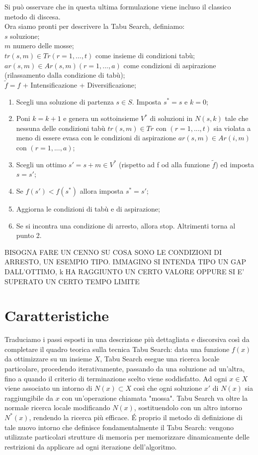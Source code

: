 Si può osservare che in questa ultima formulazione viene incluso il classico metodo di discesa.\\
Ora siamo pronti per descrivere la Tabu Search, definiamo:\\
$s$ soluzione;\\
$m$ numero delle mosse;\\
$tr(s,m) \in Tr (r=1,...,t)$ come insieme di condizioni tabù;\\
$ar(s,m) \in Ar(s,m) (r=1,...,a)$ come condizioni di aspirazione (rilassamento dalla condizione di tabù);\\
$\widetilde{f} = f$ + Intensificazione + Diversificazione;

\begin{enumerate}
\item Scegli una soluzione di partenza $s \in S$. Imposta $s^*=s$ e $k=0$;
\item Poni $k=k+1$ e genera un sottoinsieme $V^*$ di soluzioni in $N(s,k)$ tale che nessuna delle condizioni tabù $tr(s,m) \in Tr$ con $(r=1,...,t)$ sia violata a meno di essere evasa con le condizioni di aspirazione $ar(s,m) \in Ar(i,m)$ con $(r=1,...,a)$;
\item Scegli un ottimo $s'=s+m \in V^*$ (rispetto ad f od alla funzione $\widetilde{f}$) ed imposta $s=s'$;
\item Se $f(s') < f(s^*)$ allora imposta $s^*=s'$;
\item Aggiorna le condizioni di tabù e di aspirazione;
\item Se si incontra una condizione di arresto, allora stop. Altrimenti torna al punto 2.
\end{enumerate}

BISOGNA FARE UN CENNO SU COSA SONO LE CONDIZIONI DI ARRESTO, UN ESEMPIO TIPO. IMMAGINO SI INTENDA TIPO UN GAP DALL'OTTIMO, k HA RAGGIUNTO UN CERTO VALORE OPPURE SI E' SUPERATO UN CERTO TEMPO LIMITE

\section{Caratteristiche}
Traduciamo i passi esposti in una descrizione più dettagliata e discorsiva così da completare il quadro teorica sulla tecnica Tabu Search: data una funzione $f(x)$ da ottimizzare su un insieme $X$, Tabu Search esegue una ricerca locale particolare, procedendo iterativamente, passando da una soluzione ad un'altra, fino a quando il criterio di terminazione scelto viene soddisfatto. Ad ogni $x \in X$ viene associato un intorno di $N(x) \subset X$ così che ogni soluzione $x'$ di $N(x)$ sia raggiungibile da $x$ con un'operazione chiamata "mossa". Tabu Search va oltre la normale ricerca locale modificando $N(x)$, sostituendolo con un altro intorno $N^*(x)$, rendendo la ricerca più efficace. \'E proprio il metodo di definizione di tale nuovo intorno che definisce fondamentalmente il Tabu Search: vengono utilizzate particolari strutture di memoria per memorizzare dinamicamente delle restrizioni da applicare ad ogni iterazione dell'algoritmo.

